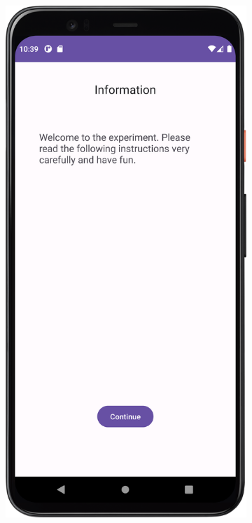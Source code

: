\begin{figure}[htbp]
    \centering
    \begin{subfigure}[b]{0.3\textwidth}
        \centering
        \includegraphics[width=\textwidth]{content/07_evaluation_of_the_solution/Screenshot_StartingScreen.png}

\end{subfigure}
\end{figure}
